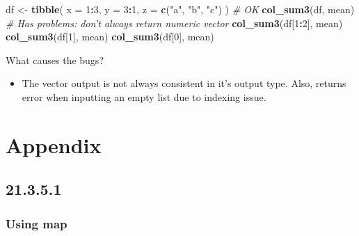 \documentclass[]{book}
\newenvironment{Shaded}{\begin{snugshade}}{\end{snugshade}}
\newcommand{\CommentTok}[1]{\textcolor[rgb]{0.56,0.35,0.01}{\textit{#1}}}
\newcommand{\DataTypeTok}[1]{\textcolor[rgb]{0.13,0.29,0.53}{#1}}
\newcommand{\DecValTok}[1]{\textcolor[rgb]{0.00,0.00,0.81}{#1}}
\newcommand{\KeywordTok}[1]{\textcolor[rgb]{0.13,0.29,0.53}{\textbf{#1}}}
\newcommand{\NormalTok}[1]{#1}
\newcommand{\OperatorTok}[1]{\textcolor[rgb]{0.81,0.36,0.00}{\textbf{#1}}}
\newcommand{\StringTok}[1]{\textcolor[rgb]{0.31,0.60,0.02}{#1}}
\providecommand{\tightlist}{%
  \setlength{\itemsep}{0pt}\setlength{\parskip}{0pt}}
\theoremstyle{definition}
\theoremstyle{definition}
\theoremstyle{definition}
\theoremstyle{remark}
\begin{document}
\begin{enumerate}
\begin{Shaded}
\begin{Highlighting}[]
\NormalTok{df <-}\StringTok{ }\KeywordTok{tibble}\NormalTok{(}
  \DataTypeTok{x =} \DecValTok{1}\OperatorTok{:}\DecValTok{3}\NormalTok{, }
  \DataTypeTok{y =} \DecValTok{3}\OperatorTok{:}\DecValTok{1}\NormalTok{,}
  \DataTypeTok{z =} \KeywordTok{c}\NormalTok{(}\StringTok{"a"}\NormalTok{, }\StringTok{"b"}\NormalTok{, }\StringTok{"c"}\NormalTok{)}
\NormalTok{)}
\CommentTok{# OK}
\KeywordTok{col_sum3}\NormalTok{(df, mean) }
\CommentTok{# Has problems: don't always return numeric vector}
\KeywordTok{col_sum3}\NormalTok{(df[}\DecValTok{1}\OperatorTok{:}\DecValTok{2}\NormalTok{], mean) }
\KeywordTok{col_sum3}\NormalTok{(df[}\DecValTok{1}\NormalTok{], mean) }
\KeywordTok{col_sum3}\NormalTok{(df[}\DecValTok{0}\NormalTok{], mean)}
\end{Highlighting}
\end{Shaded}

  What causes the bugs?

  \begin{itemize}
  \tightlist
  \item
    The vector output is not always consistent in it's output type.
    Also, returns error when inputting an empty list due to indexing
    issue.
  \end{itemize}
\end{enumerate}

\hypertarget{appendix-7}{%
\chapter{Appendix}\label{appendix-7}}

\hypertarget{section-77}{%
\section{21.3.5.1}\label{section-77}}

\hypertarget{using-map}{%
\subsection{Using map}\label{using-map}}

\begin{Shaded}
\end{Shaded}
\end{document}

